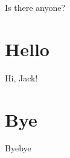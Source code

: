 \documentclass[10pt,a4paper]{article}
\begin{document}
	Is there anyone? 
	\section{Hello}
	Hi, Jack!
	\section{Bye}
	Byebye
\end{document}
